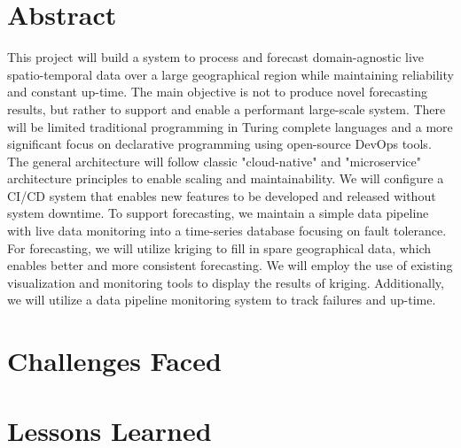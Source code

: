 \section{Abstract}

\noindent This project will build a system to process and forecast domain-agnostic live spatio-temporal data over a large geographical region while maintaining reliability and constant up-time.
The main objective is not to produce novel forecasting results, but rather to support and enable a performant large-scale system.
There will be limited traditional programming in Turing complete languages and a more significant focus on declarative programming using open-source DevOps tools.
The general architecture will follow classic "cloud-native" and "microservice" architecture principles to enable scaling and maintainability.
We will configure a CI/CD system that enables new features to be developed and released without system downtime.
To support forecasting, we maintain a simple data pipeline with live data monitoring into a time-series database focusing on fault tolerance.
For forecasting, we will utilize kriging to fill in spare geographical data, which enables better and more consistent forecasting.
We will employ the use of existing visualization and monitoring tools to display the results of kriging.
Additionally, we will utilize a data pipeline monitoring system to track failures and up-time. 


\section{Challenges Faced}

\section{Lessons Learned}
